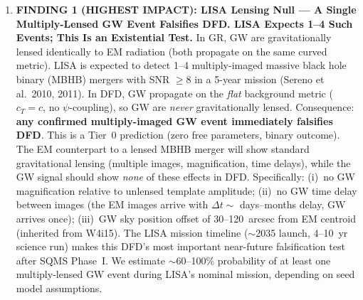 \documentclass[11pt]{article}
\theoremstyle{definition}
\theoremstyle{remark}
\begin{document}
\begin{tcolorbox}[colback=blue!5!white, colframe=blue!60!black,
  title=\textbf{TOP 5 FINDINGS --- W4i16 P6 (Ranked by Impact)}]
\begin{enumerate}[nosep]

\item \textbf{FINDING 1 (HIGHEST IMPACT): LISA Lensing Null ---
  A Single Multiply-Lensed GW Event Falsifies DFD.
  LISA Expects 1--4 Such Events; This Is an Existential Test.}
  In GR, GW are gravitationally lensed identically to EM radiation
  (both propagate on the same curved metric).  LISA is expected to
  detect 1--4 multiply-imaged massive black hole binary (MBHB) mergers
  with SNR $\geq 8$ in a 5-year mission (Sereno et al.\ 2010, 2011).
  In DFD, GW propagate on the \emph{flat} background metric
  ($c_T = c$, no $\psi$-coupling), so GW are \emph{never}
  gravitationally lensed.  Consequence: \textbf{any confirmed
  multiply-imaged GW event immediately falsifies DFD}.
  This is a Tier~0 prediction (zero free parameters, binary outcome).
  The EM counterpart to a lensed MBHB merger will show standard
  gravitational lensing (multiple images, magnification, time delays),
  while the GW signal should show \emph{none} of these effects in DFD.
  Specifically: (i)~no GW magnification relative to unlensed template
  amplitude; (ii)~no GW time delay between images (the EM images
  arrive with $\Delta t \sim$ days--months delay, GW arrives once);
  (iii)~GW sky position offset of 30--120~arcsec from EM centroid
  (inherited from W4i15).
  The LISA mission timeline ($\sim$2035 launch, 4--10~yr science run)
  makes this DFD's most important near-future falsification test
  after SQMS Phase~I.  We estimate $\sim$60--100\% probability of
  at least one multiply-lensed GW event during LISA's nominal mission,
  depending on seed model assumptions.


\end{enumerate}
\end{tcolorbox}
\end{document}
